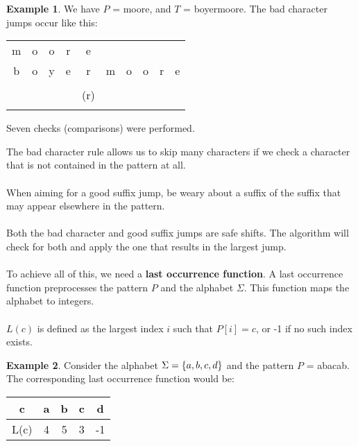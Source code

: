 \documentclass[]{article}
\theoremstyle{definition}
\newtheorem{ex}{Example}[section]
\DeclarePairedDelimiter{\set}{\lbrace}{\rbrace}
\begin{document}
				\begin{ex}
					We have $P$ = moore, and $T$ = boyermoore. The bad character jumps occur like this:
					\begin{center}
						\begin{tabular}{|c|c|c|c|c|c|c|c|c|c|}
							m & o & o & r & e & & & & & \\
							b & o & y & e & r & m & o & o & r & e \\ \hline \hline
							& & & & \color{red}{e} & & & & & \\
							& & & & (r) & \color{red}{e} & & & & \\
							& & & & & \color{green}{(m)} & \color{green}{o} & \color{green}{o} & \color{green}{r} & \color{green}{e} \\ \hline
						\end{tabular}
					\end{center}

					Seven checks (comparisons) were performed.
				\end{ex}

				The bad character rule allows us to skip many characters if we check a character that is not contained in the pattern at all.
				\\ \\
				When aiming for a good suffix jump, be weary about a suffix of the suffix that may appear elsewhere in the pattern.
				\\ \\
				Both the bad character and good suffix jumps are safe shifts. The algorithm will check for both and apply the one that results in the largest jump.
				\\ \\
				To achieve all of this, we need a \textbf{last occurrence function}. A last occurrence function preprocesses the pattern $P$ and the alphabet $\Sigma$. This function maps the alphabet to integers.
				\\ \\
				$L(c)$ is defined as the largest index $i$ such that $P[i] = c$, or -1 if no such index exists.

				\begin{ex}
					Consider the alphabet $\Sigma = \set{a, b, c, d}$ and the pattern $P$ = abacab. The corresponding last occurrence function would be:
					\begin{center}
						\begin{tabular}{|c||c|c|c|c|}
							\hline
							c & a & b & c & d \\ \hline
							L(c) & 4 & 5 & 3 & -1 \\ \hline
						\end{tabular}
					\end{center}
				\end{ex}
\end{document}
